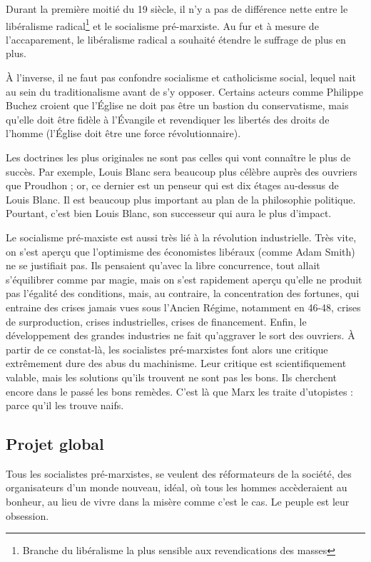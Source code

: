 \documentclass[12pt]{report}
\begin{document}


Durant la première moitié du 19 siècle, il n'y a pas de différence nette entre le libéralisme radical\footnote{Branche du libéralisme la plus sensible aux revendications des masses} et le socialisme pré-marxiste. Au fur et à mesure de l'accaparement, le libéralisme radical a souhaité étendre le suffrage de plus en plus. 

À l'inverse, il ne faut pas confondre socialisme et catholicisme social, lequel nait au sein du traditionalisme avant de s'y opposer. Certains acteurs comme Philippe Buchez croient que l'Église ne doit pas être un bastion du conservatisme, mais qu'elle doit être fidèle à l'Évangile et revendiquer les libertés des droits de l'homme (l'Église doit être une force révolutionnaire).

Les doctrines les plus originales ne sont pas celles qui vont connaître le plus de succès. Par exemple, Louis Blanc sera beaucoup plus célèbre auprès des ouvriers que Proudhon ; or, ce dernier est un penseur qui est dix étages au-dessus de Louis Blanc. Il est beaucoup plus important au plan de la philosophie politique. Pourtant, c'est bien Louis Blanc, son successeur qui aura le plus d'impact.

Le socialisme pré-maxiste est aussi très lié à la révolution industrielle. Très vite, on s'est aperçu que l'optimisme des économistes libéraux (comme Adam Smith) ne se justifiait pas. Ils pensaient qu'avec la libre concurrence, tout allait s'équilibrer comme par magie, mais on s'est rapidement aperçu qu'elle ne produit pas l'égalité des conditions, mais, au contraire, la concentration des fortunes, qui entraine des crises jamais vues sous l'Ancien Régime, notamment en 46-48, crises de surproduction, crises industrielles, crises de financement. Enfin, le développement des grandes industries ne fait qu'aggraver le sort des ouvriers. À partir de ce constat-là, les socialistes pré-marxistes font alors une critique extrêmement dure des abus du machinisme. Leur critique est scientifiquement valable, mais les solutions qu'ils trouvent ne sont pas les bons. Ils cherchent encore dans le passé les bons remèdes. C'est là que Marx les traite d'utopistes : parce qu'il les trouve naifs.

\subsection{Projet global}

Tous les socialistes pré-marxistes, se veulent des réformateurs de la société, des organisateurs d'un monde nouveau, idéal, où tous les hommes accèderaient au bonheur, au lieu de vivre dans la misère comme c'est le cas. Le peuple est leur obsession.
\end{document}
